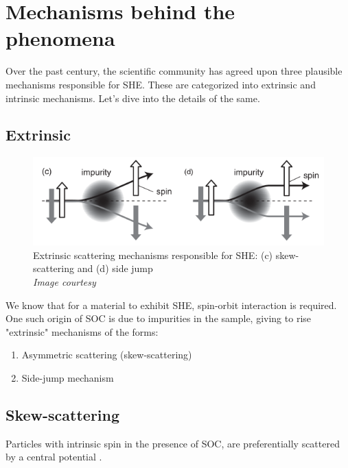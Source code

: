 \section{Mechanisms behind the phenomena}

\label{sec:mechanisms}

Over the past century, the scientific community has agreed upon three plausible mechanisms responsible for SHE. These are categorized into extrinsic and intrinsic mechanisms. Let's dive into the details of the same.

\subsection{Extrinsic}

\begin{figure}[h!]
    \centering
    \includegraphics[scale=0.7]{she-mechanisms.png}
    \caption{Extrinsic scattering mechanisms responsible for SHE: (c) skew-scattering and (d) side jump\\ \vspace{0.2cm} \textit{Image courtesy \cite{murakami2015spin}}}
    \label{fig:skew-vs-side}
\end{figure}

We know that for a material to exhibit SHE, spin-orbit interaction is required. One such origin of SOC is due to impurities in the sample, giving to rise "extrinsic" mechanisms of the forms:

\begin{enumerate}
    \item Asymmetric scattering (skew-scattering)
    \item Side-jump mechanism
\end{enumerate}


\subsection*{Skew-scattering}

Particles with intrinsic spin in the presence of SOC, are preferentially scattered by a central potential \cite{mott1964w}.


